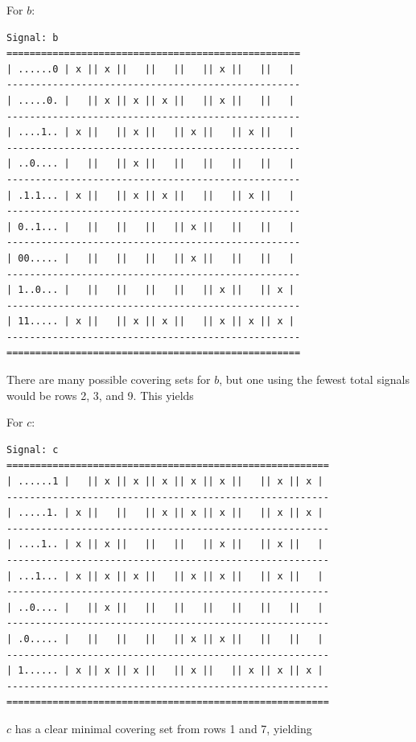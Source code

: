 \documentclass{article}
\begin{document}
\begin{enumerate}
            For $b$:
            \begin{scriptsize}
            \begin{verbatim}
Signal: b
===================================================
| ......0 | x || x ||   ||   ||   || x ||   ||   |
---------------------------------------------------
| .....0. |   || x || x || x ||   || x ||   ||   |
---------------------------------------------------
| ....1.. | x ||   || x ||   || x ||   || x ||   |
---------------------------------------------------
| ..0.... |   ||   || x ||   ||   ||   ||   ||   |
---------------------------------------------------
| .1.1... | x ||   || x || x ||   ||   || x ||   |
---------------------------------------------------
| 0..1... |   ||   ||   ||   || x ||   ||   ||   |
---------------------------------------------------
| 00..... |   ||   ||   ||   || x ||   ||   ||   |
---------------------------------------------------
| 1..0... |   ||   ||   ||   ||   || x ||   || x |
---------------------------------------------------
| 11..... | x ||   || x || x ||   || x || x || x |
---------------------------------------------------
===================================================
            \end{verbatim}
            \end{scriptsize}
            There are many possible covering sets for $b$, but one using the
            fewest total signals would be rows 2, 3, and 9. This yields 

            For $c$:
            \begin{scriptsize}
            \begin{verbatim}
Signal: c
========================================================
| ......1 |   || x || x || x || x || x ||   || x || x |
--------------------------------------------------------
| .....1. | x ||   ||   || x || x || x ||   || x || x |
--------------------------------------------------------
| ....1.. | x || x ||   ||   ||   || x ||   || x ||   |
--------------------------------------------------------
| ...1... | x || x || x ||   || x || x ||   || x ||   |
--------------------------------------------------------
| ..0.... |   || x ||   ||   ||   ||   ||   ||   ||   |
--------------------------------------------------------
| .0..... |   ||   ||   ||   || x || x ||   ||   ||   |
--------------------------------------------------------
| 1...... | x || x || x ||   || x ||   || x || x || x |
--------------------------------------------------------
========================================================
            \end{verbatim}
            \end{scriptsize}
            $c$ has a clear minimal covering set from rows 1 and 7, yielding 
            \pagebreak


\end{enumerate}
\end{document}
